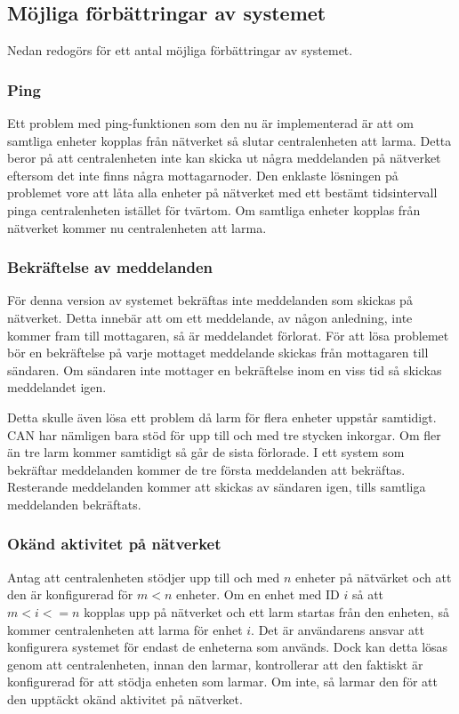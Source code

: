 \subsection{Möjliga förbättringar av systemet}

Nedan redogörs för ett antal möjliga förbättringar av systemet.

\subsubsection*{Ping}

Ett problem med ping-funktionen som den nu är implementerad är att om samtliga enheter kopplas från nätverket så slutar centralenheten att larma. Detta beror på att centralenheten inte kan skicka ut några meddelanden på nätverket eftersom det inte finns några mottagarnoder. Den enklaste lösningen på problemet vore att låta alla enheter på nätverket med ett bestämt tidsintervall pinga centralenheten istället för tvärtom. Om samtliga enheter kopplas från nätverket kommer nu centralenheten att larma.

\subsubsection*{Bekräftelse av meddelanden}

För denna version av systemet bekräftas inte meddelanden som skickas på nätverket. Detta innebär att om ett meddelande, av någon anledning, inte kommer fram till mottagaren, så är meddelandet förlorat. För att lösa problemet bör en bekräftelse på varje mottaget meddelande skickas från mottagaren till sändaren. Om sändaren inte mottager en bekräftelse inom en viss tid så skickas meddelandet igen.

Detta skulle även lösa ett problem då larm för flera enheter uppstår samtidigt. CAN har nämligen bara stöd för upp till och med tre stycken inkorgar. Om fler än tre larm kommer samtidigt så går de sista förlorade. I ett system som bekräftar meddelanden kommer de tre första meddelanden att bekräftas. Resterande meddelanden kommer att skickas av sändaren igen, tills samtliga meddelanden bekräftats.

\subsubsection*{Okänd aktivitet på nätverket}

Antag att centralenheten stödjer upp till och med $n$ enheter på nätvärket och att den är konfigurerad för $m < n$ enheter. Om en enhet med ID $i$ så att $m < i <= n$ kopplas upp på nätverket och ett larm startas från den enheten, så kommer centralenheten att larma för enhet $i$. Det är användarens ansvar att konfigurera systemet för endast de enheterna som används. Dock kan detta lösas genom att centralenheten, innan den larmar, kontrollerar att den faktiskt är konfigurerad för att stödja enheten som larmar. Om inte, så larmar den för att den upptäckt okänd aktivitet på nätverket.

